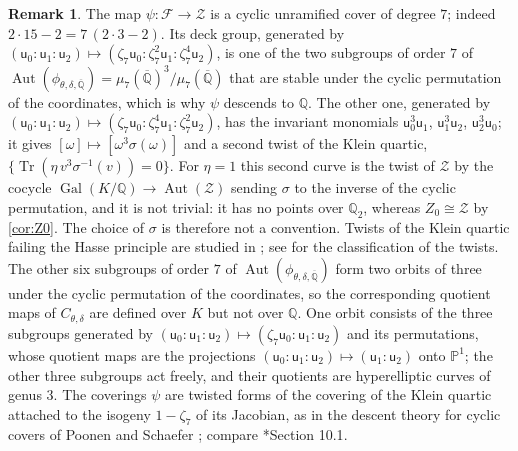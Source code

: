 \documentclass[12pt]{amsart}
\renewcommand{\P}{\mathbb{P}}
\newcommand{\Q}{\mathbb{Q}}
\newcommand{\Qbar}{{\overline{\Q}}}
\newcommand{\Pone}{\P^{1}}
\newcommand{\calF}{{\mathcal F}}
\newcommand{\calZ}{{\mathcal Z}}
\newcommand{\sfu}{\mathsf{u}}
\DeclareMathOperator{\Aut}{Aut}
\DeclareMathOperator{\Gal}{Gal}
\DeclareMathOperator{\Tr}{Tr}
\numberwithin{equation}{section}
\theoremstyle{definition}
\newtheorem{remark}[theorem]{Remark}
\begin{document}
\begin{remark}
  \label{rem:elkies-map}
  The map $\psi \colon \calF \to \calZ$ is a cyclic unramified cover of degree
  $7$; indeed $2 \cdot 15 - 2 = 7\,(2 \cdot 3 - 2)$. Its deck group, generated
  by $(\sfu_0:\sfu_1:\sfu_2) \mapsto (\zeta_7\sfu_0 : \zeta_7^{2}\sfu_1 :
  \zeta_7^{4}\sfu_2)$, is one of the two subgroups of order $7$ of
  $\Aut(\phi_{\theta,\delta,\Qbar}) = \mu_7(\Qbar)^3/\mu_7(\Qbar)$ that are
  stable under the cyclic permutation of the coordinates, which is why $\psi$
  descends to $\Q$. The other one, generated by $(\sfu_0:\sfu_1:\sfu_2) \mapsto
  (\zeta_7\sfu_0 : \zeta_7^{4}\sfu_1 : \zeta_7^{2}\sfu_2)$, has the invariant
  monomials $\sfu_0^3\sfu_1$, $\sfu_1^3\sfu_2$, $\sfu_2^3\sfu_0$; it gives
  $[\omega] \mapsto [\omega^3\sigma(\omega)]$ and a second twist of the Klein
  quartic, $\{\Tr(\eta\, v^3\sigma^{-1}(v)) = 0\}$. For $\eta = 1$ this second curve is the twist of
  $\calZ$ by the cocycle $\Gal(K/\Q) \to \Aut(\calZ)$ sending
  $\sigma$ to the inverse of the cyclic permutation, and it is not trivial: it
  has no points over $\Q_2$, whereas $Z_0 \cong \calZ$ by \cref{cor:Z0}. The choice
  of $\sigma$ is therefore not a convention. Twists
  of the Klein quartic failing the Hasse principle are studied in
  \cite{LGV-24}; see \cite{FLS-18} for the classification of the twists. The other
  six subgroups of order $7$ of $\Aut(\phi_{\theta,\delta,\Qbar})$ form two
  orbits of three under the cyclic permutation of the coordinates, so the
  corresponding quotient maps of $C_{\theta,\delta}$ are defined over $K$ but
  not over $\Q$. One orbit consists of the three subgroups generated by
  $(\sfu_0:\sfu_1:\sfu_2) \mapsto (\zeta_7\sfu_0:\sfu_1:\sfu_2)$ and its
  permutations, whose quotient maps are the projections
  $(\sfu_0:\sfu_1:\sfu_2) \mapsto (\sfu_1:\sfu_2)$ onto $\Pone$; the other
  three subgroups act freely, and their quotients are hyperelliptic curves of
  genus $3$. The coverings $\psi$ are twisted forms of the covering of the Klein
  quartic attached to the isogeny $1 - \zeta_7$ of its Jacobian, as in the
  descent theory for cyclic covers of Poonen and Schaefer \cite{PS-97}; compare
  \cite{PSS-07}*{Section 10.1}.
\end{remark}
\end{document}

